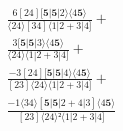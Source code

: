 \documentclass[varwidth, border=5pt]{standalone}
\begin{document}
\begin{my}
$\begin{gathered}
\scriptscriptstyle\frac{6[24][𝟓|𝟓|2⟩⟨4𝟓⟩}{⟨24⟩[34]⟨1|2+3|4]} +\\
\scriptscriptstyle\frac{3[𝟓|𝟓|3⟩⟨4𝟓⟩}{⟨24⟩⟨1|2+3|4]} +\\
\scriptscriptstyle\frac{-3[24][𝟓|𝟓|4⟩⟨4𝟓⟩}{[23]⟨24⟩⟨1|2+3|4]} +\\
\scriptscriptstyle\frac{-1⟨34⟩[𝟓|𝟓|2+4|3]⟨4𝟓⟩}{[23]⟨24⟩²⟨1|2+3|4]} \phantom{+}
\end{gathered}$
\end{my}
\end{document}
